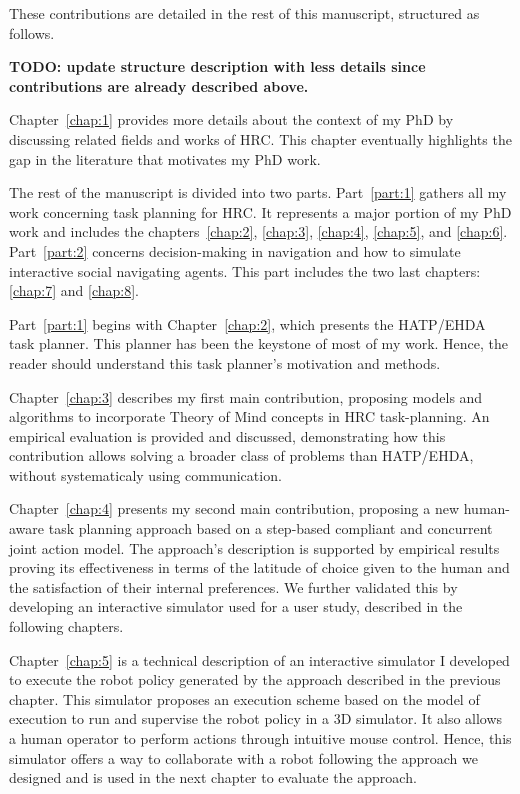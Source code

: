 These contributions are detailed in the rest of this manuscript, structured as follows.

\textbf{TODO: update structure description with less details since contributions are already described above.}

Chapter~\ref{chap:1} provides more details about the context of my PhD by discussing related fields and works of HRC. This chapter eventually highlights the gap in the literature that motivates my PhD work.

The rest of the manuscript is divided into two parts. Part~\ref{part:1} gathers all my work concerning task planning for HRC. It represents a major portion of my PhD work and includes the chapters~\ref{chap:2}, \ref{chap:3}, \ref{chap:4}, \ref{chap:5}, and \ref{chap:6}. Part~\ref{part:2} concerns decision-making in navigation and how to simulate interactive social navigating agents. This part includes the two last chapters: \ref{chap:7} and \ref{chap:8}.

Part~\ref{part:1} begins with Chapter~\ref{chap:2}, which presents the HATP/EHDA task planner. This planner has been the keystone of most of my work. Hence, the reader should understand this task planner's motivation and methods.

Chapter~\ref{chap:3} describes my first main contribution, proposing models and algorithms to incorporate Theory of Mind concepts in HRC task-planning. An empirical evaluation is provided and discussed, demonstrating how this contribution allows solving a broader class of problems than HATP/EHDA, without systematicaly using communication.

Chapter~\ref{chap:4} presents my second main contribution, proposing a new human-aware task planning approach based on a step-based compliant and concurrent joint action model. The approach's description is supported by empirical results proving its effectiveness in terms of the latitude of choice given to the human and the satisfaction of their internal preferences. We further validated this by developing an interactive simulator used for a user study, described in the following chapters.

Chapter~\ref{chap:5} is a technical description of an interactive simulator I developed to execute the robot policy generated by the approach described in the previous chapter. This simulator proposes an execution scheme based on the model of execution to run and supervise the robot policy in a 3D simulator. It also allows a human operator to perform actions through intuitive mouse control. Hence, this simulator offers a way to collaborate with a robot following the approach we designed and is used in the next chapter to evaluate the approach.    

